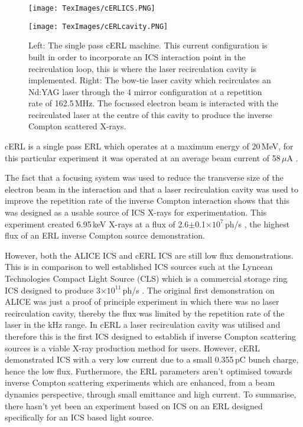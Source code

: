 \documentclass[11pt]{article}
\begin{document}
\begin{figure}[H]
\begin{minipage}{0.6\textwidth}
\texttt{[image: TexImages/cERLICS.PNG]}
\end{minipage}
\hfill
\begin{minipage}{\textwidth}
\texttt{[image: TexImages/cERLcavity.PNG]}
\end{minipage}
\caption{\label{fig:cERLICS} Left: The single pass cERL machine. This current configuration is built in order to incorporate an ICS interaction point in the recirculation loop, this is where the laser recirculation cavity is implemented. Right: The bow-tie laser cavity which recirculates an Nd:YAG laser through the 4 mirror configuration at a repetition rate of 162.5\,MHz. The focussed electron beam is interacted with the recirculated laser at the centre of this cavity to produce the inverse Compton scattered X-rays. \cite{TAkagicERL}}
\end{figure}

cERL is a single pass ERL which operates at a maximum energy of 20\,MeV, for this particular experiment it  was operated at an average beam current of 58\,$\mu$A \cite{TAkagicERL}.

The fact that a focusing system was used to reduce the transverse size of the electron beam in the interaction and that a laser recirculation cavity was used to improve the repetition rate of the inverse Compton interaction shows that this was designed as a usable source of ICS X-rays for experimentation. This experiment created 6.95\,keV X-rays at a flux of 2.6$\pm$0.1$\times10^{7}$\,ph/s \cite{TAkagicERL}, the highest flux of an ERL inverse Compton source demonstration.

\vspace{5mm}

However, both the ALICE ICS and cERL ICS are still low flux demonstrations. This is in comparison to well established ICS sources such at the Lyncean Technologies Compact Light Source (CLS) which is a commercial storage ring ICS designed to produce 3$\times10^{11}$\,ph/s \cite{LynceanCLS}. The original first demonstration on ALICE was just a proof of principle experiment in which there was no laser recirculation cavity, thereby the flux was limited by the repetition rate of the laser in the kHz range. In cERL a laser recirculation cavity was utilised and therefore this is the first ICS designed to establish if inverse Compton scattering sources is a viable X-ray production method for users. However, cERL demonstrated ICS with a very low current due to a small 0.355\,pC \cite{TAkagicERL} bunch charge, hence the low flux. Furthermore, the ERL parameters aren't optimised towards inverse Compton scattering experiments which are enhanced, from a beam dynamics perspective, through small emittance and high current. To summarise, there hasn't yet been an experiment based on ICS on an ERL designed specifically for an ICS based light source.
\end{document}
